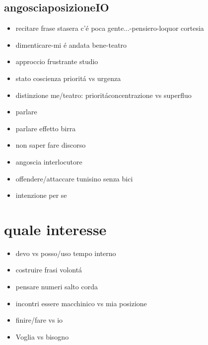 \subsection{angosciaposizioneIO}

\begin{itemize}

\item recitare frase stasera c'\'e poca gente...-pensiero-loquor cortesia

\item dimenticare-mi \'e andata bene-teatro

\item approccio frustrante studio

\item stato coscienza priorit\'a vs urgenza

\item distinzione me/teatro: priorit\'aconcentrazione vs superfluo

\item parlare

\item parlare effetto birra

\item non saper fare discorso

\item angoscia interlocutore

\item offendere/attaccare tunisino senza bici

\item intenzione per se

\end{itemize}


\section{quale interesse}

\begin{itemize}

\item devo vs posso/uso tempo interno

\item costruire frasi volont\'a

\item pensare numeri salto corda

\item incontri essere macchinico vs mia posizione

\item finire/fare vs io

\item Voglia vs bisogno

\end{itemize}

